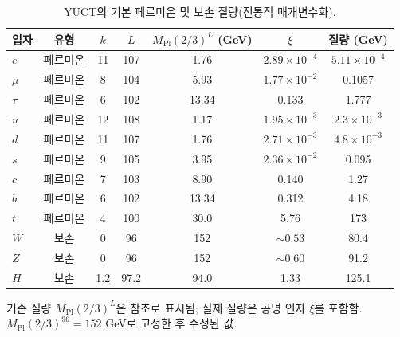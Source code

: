 \documentclass[11pt,a4paper]{article}
\begin{document}
	\vspace{2.0cm}
	
	\begin{table}[H]
		\centering
		\caption{YUCT의 기본 페르미온 및 보손 질량(전통적 매개변수화).}
		\label{tab:fermions}
		\normalsize
		\begin{tabular}{l c c c c c c}
			\toprule
			입자 & 유형 & \(k\) & \(L\) & \(M_{\mathrm{Pl}}(2/3)^L\) (GeV) & \(\xi\) & 질량 (GeV) \\
			\midrule
			\(e\) & 페르미온 & 11 & 107 & 1.76 & \(2.89\times10^{-4}\) & \(5.11\times10^{-4}\) \\
			\(\mu\) & 페르미온 & 8  & 104 & 5.93 & \(1.77\times10^{-2}\) & 0.1057 \\
			\(\tau\) & 페르미온 & 6  & 102 & 13.34 & 0.133 & 1.777 \\
			\(u\) & 페르미온 & 12 & 108 & 1.17 & \(1.95\times10^{-3}\) & \(2.3\times10^{-3}\) \\
			\(d\) & 페르미온 & 11 & 107 & 1.76 & \(2.71\times10^{-3}\) & \(4.8\times10^{-3}\) \\
			\(s\) & 페르미온 & 9  & 105 & 3.95 & \(2.36\times10^{-2}\) & 0.095 \\
			\(c\) & 페르미온 & 7  & 103 & 8.90 & 0.140 & 1.27 \\
			\(b\) & 페르미온 & 6  & 102 & 13.34 & 0.312 & 4.18 \\
			\(t\) & 페르미온 & 4  & 100 & 30.0 & 5.76 & 173 \\
			\midrule
			\(W\) & 보손 & 0 & 96 & 152 & \(\sim0.53\) & 80.4 \\
			\(Z\) & 보손 & 0 & 96 & 152 & \(\sim0.60\) & 91.2 \\
			\(H\) & 보손 & 1.2 & 97.2 & 94.0 & 1.33 & 125.1 \\
			\bottomrule
		\end{tabular}
		\par\smallskip
		\footnotesize 기준 질량 \(M_{\mathrm{Pl}}(2/3)^L\)은 참조로 표시됨; 실제 질량은 공명 인자 \(\xi\)를 포함함. \(M_{\mathrm{Pl}}(2/3)^{96}=152\) GeV로 고정한 후 수정된 값.
	\end{table}
	
\end{document}
